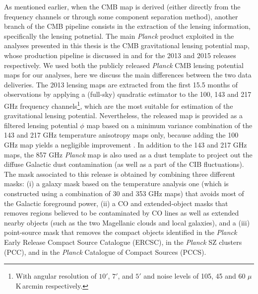 As mentioned earlier, when the \gls{CMB} map is derived (either directly from the frequency channels or through some component separation method), another branch of the \gls{CMB} pipeline consists in the extraction of the lensing information, specifically the lensing potnetial. The main \textit{Planck} product exploited in the analyses presented in this thesis is the \gls{CMB} gravitational lensing potential map, whose production pipeline is discussed in \citet{Ade2014c} and \citet{PlanckCollaboration2015} for the 2013 and 2015 releases respectively. We used both the publicly released \emph{Planck} CMB lensing potential maps for our analyses, here we discuss the main differences between the two data deliveries. The 2013 lensing maps are extracted from the first 15.5 months of observations by applying a (full-sky) quadratic estimator \citep{Hu2002} to the 100, 143 and 217 GHz frequency channels\footnote{With angular resolution of $10'$, $7'$, and $5'$ and noise levels of 105, 45 and 60 $\mu$K\,arcmin  respectively.}, which are the most suitable for estimation of the gravitational lensing potential. Nevertheless, the released map is provided as a filtered lensing potential $\phi$ map based on a minimum variance combination of the 143 and 217 GHz temperature anisotropy maps only, because adding the 100 GHz map yields a negligible improvement \citep{Ade2014c}. In addition to the 143 and 217 GHz maps, the 857 GHz \textit{Planck} map is also used as a dust template to project out the diffuse Galactic dust contamination (as well as a part of the \gls{CIB} fluctuations). The mask associated to this release is obtained by combining three different masks: (i) a galaxy mask based on the temperature analysis one (which is constructed using a combination of 30 and 353 GHz maps) that avoids most of the Galactic foreground power, (ii) a CO and extended-object masks that removes regions believed to be contaminated by CO lines as well as extended nearby objects (such as the two Magellanic clouds and local galaxies), and a (iii) point-source mask that removes the compact objects identified in the \textit{Planck} Early Release Compact Source Catalogue (ERCSC), in the \textit{Planck} \gls{SZ} clusters (PCC), and in the \textit{Planck} Catalogue of Compact Sources (PCCS).

